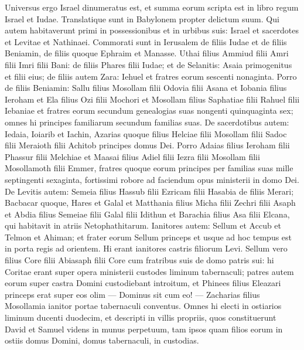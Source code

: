 \begin{biblechapter}  
\verse Universus ergo Israel dinumeratus est, et summa eorum scripta est in libro regum Israel et Iudae. Translatique sunt in Babylonem propter delictum suum. 
\verse Qui autem habitaverunt primi in possessionibus et in urbibus suis: Israel et sacerdotes et Levitae et Nathinaei. 
\verse Commorati sunt in Ierusalem de filiis Iudae et de filiis Beniamin, de filiis quoque Ephraim et Manasse. 
\verse Uthai filius Ammiud filii Amri filii Imri filii Bani: de filiis Phares filii Iudae; 
\verse et de Selanitis: Asaia primogenitus et filii eius; 
\verse de filiis autem Zara: Iehuel et fratres eorum sescenti nonaginta. 
\verse Porro de filiis Beniamin: Sallu filius Mosollam filii Odovia filii Asana  
\verse et Iobania filius Ieroham et Ela filius Ozi filii Mochori et Mosollam filius Saphatiae filii Rahuel filii Iebaniae 
\verse et fratres eorum secundum genealogias suas nongenti quinquaginta sex; omnes hi principes familiarum secundum familias suas. 
\verse De sacerdotibus autem: Iedaia, Ioiarib et Iachin, 
\verse Azarias quoque filius Helciae filii Mosollam filii Sadoc filii Meraioth filii Achitob principes domus Dei. 
\verse Porro Adaias filius Ieroham filii Phassur filii Melchiae et Maasai filius Adiel filii Iezra filii Mosollam filii Mosollamoth filii Emmer,  
\verse fratres quoque eorum principes per familias suas mille septingenti sexaginta, fortissimi robore ad faciendum opus ministerii in domo Dei. 
\verse De Levitis autem: Semeia filius Hassub filii Ezricam filii Hasabia de filiis Merari; 
\verse Bacbacar quoque, Hares et Galal et Matthania filius Micha filii Zechri filii Asaph 
\verse et Abdia filius Semeiae filii Galal filii Idithun et Barachia filius Asa filii Elcana, qui habitavit in atriis Netophathitarum.  
\verse Ianitores autem: Sellum et Accub et Telmon et Ahiman; et frater eorum Sellum princeps 
\verse et usque ad hoc tempus est in porta regis ad orientem. Hi erant ianitores castris filiorum Levi. 
\verse Sellum vero filius Core filii Abiasaph filii Core cum fratribus suis de domo patris sui: hi Coritae erant super opera ministerii custodes liminum tabernaculi; patres autem eorum super castra Domini custodiebant introitum, 
\verse et Phinees filius Eleazari princeps erat super eos olim — Dominus sit cum eo! — 
\verse Zacharias filius Mosollamia ianitor portae tabernaculi conventus. 
\verse Omnes hi electi in ostiarios liminum ducenti duodecim, et descripti in villis propriis, quos constituerunt David et Samuel videns in munus perpetuum, 
\verse tam ipsos quam filios eorum in ostiis domus Domini, domus tabernaculi, in custodias. 

\end{biblechapter}
